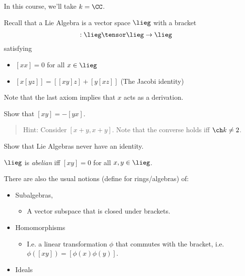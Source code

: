 In this course, we'll take \(k = \CC\).

\begin{definition}

Recall that a Lie Algebra is a vector space \(\lieg\) with a bracket
\begin{align*}
[\wait, \wait]: \lieg\tensor \lieg \to \lieg
\end{align*} satisfying

\begin{itemize}
\item
  \([x x] = 0\) for all \(x\in \lieg\)
\item
  \([x [y z]] = [[x y] z] + [y [x z]]\) (The Jacobi identity)
\end{itemize}

\end{definition}

Note that the last axiom implies that \(x\) acts as a derivation.

\begin{exercise}[?]

Show that \([x y] = -[y x]\).

\begin{quote}
Hint: Consider \([x+y, x+y]\). Note that the converse holds iff
\(\ch k \neq 2\).
\end{quote}

\end{exercise}

\begin{exercise}[?]

Show that Lie Algebras never have an identity.

\end{exercise}

\begin{definition}

\(\lieg\) is \emph{abelian} iff \([x y] = 0\) for all \(x,y\in\lieg\).

\end{definition}

There are also the usual notions (define for rings/algebras) of:

\begin{itemize}
\tightlist
\item
  Subalgebras,

  \begin{itemize}
  \tightlist
  \item
    A vector subspace that is closed under brackets.
  \end{itemize}
\item
  Homomorphisms

  \begin{itemize}
  \tightlist
  \item
    I.e. a linear transformation \(\phi\) that commutes with the
    bracket, i.e.~\(\phi([x y]) = [\phi(x) \phi(y)]\).
  \end{itemize}
\item
  Ideals
\end{itemize}

